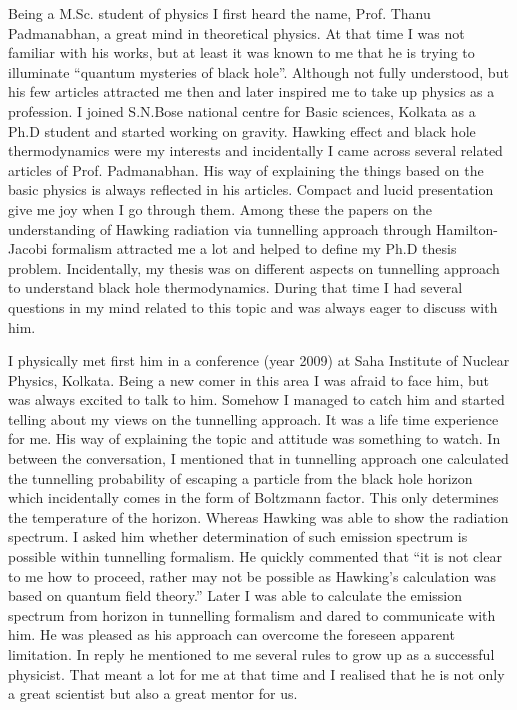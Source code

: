 \documentclass[prd, preprint, longbibliography, 12pt]{revtex4-2}
\begin{document}
\noindent %
Being a M.Sc. student of physics I first heard the name, Prof. Thanu Padmanabhan, a great mind in theoretical physics. At that time I was not familiar with his works, but at least it was known to me that he is trying to illuminate ``quantum mysteries of black hole''. Although not fully understood, but his few articles attracted me then and later inspired me to take up physics as a profession. I joined S.N.Bose national centre for Basic sciences, Kolkata as a Ph.D student and started working on gravity. Hawking effect \cite{Hawking:1974rv,Hawking:1975vcx} and black hole thermodynamics \cite{Bekenstein:1973ur,Bekenstein:1974ax} were my interests and incidentally I came across several related articles of Prof. Padmanabhan. His way of explaining the things based on the basic physics is always reflected in his articles. Compact and lucid presentation give me joy when I go through them.  Among these the papers on the understanding of Hawking radiation via tunnelling approach through Hamilton-Jacobi formalism \cite{Srinivasan:1998ty} attracted me a lot and helped to define my Ph.D thesis problem.  Incidentally, my thesis \cite{Majhi:2010onr} was on different aspects on tunnelling approach to understand black hole  thermodynamics. During that time I had several questions in my mind related to this topic and was always eager to discuss with him.

I physically met first him in a conference (year 2009) at Saha Institute of Nuclear Physics, Kolkata. Being a new comer in this area I was afraid to face him, but was always excited to talk to him. Somehow I managed to catch him and started telling about my views on the tunnelling approach. It was a life time experience for me. His way of explaining the topic and attitude was something to watch. In between the conversation, I mentioned that in tunnelling approach one calculated the tunnelling probability of escaping a particle from the black hole horizon which incidentally comes in the form of Boltzmann factor. This only determines the temperature of the horizon. Whereas Hawking was able to show the radiation spectrum. I asked him whether determination of such emission spectrum is possible within tunnelling formalism. He quickly commented that ``it is not clear to me how to proceed, rather may not be possible as Hawking's calculation was based on quantum field theory.''  Later I was able to calculate the emission spectrum from horizon in tunnelling formalism \cite{Banerjee:2009wb} and dared to communicate with him. He was pleased as his approach can overcome the foreseen apparent limitation. In reply he mentioned to me several rules to grow up as a successful physicist. That meant a lot for me at that time and I realised that he is not only a great scientist but also a great mentor for us. 
\end{document}
